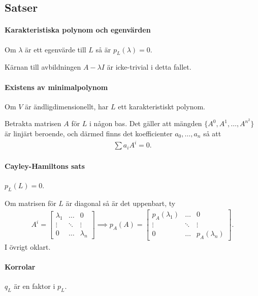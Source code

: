 \subsection{Satser}

\paragraph{Karakteristiska polynom och egenvärden}
Om $\lambda$ är ett egenvärde till $L$ så är $p_{L}(\lambda) = 0$.

\proof
Kärnan till avbildningen $A - \lambda I$ är icke-trivial i detta fallet.

\paragraph{Existens av minimalpolynom}
Om $V$ är ändligdimensionellt, har $L$ ett karakteristiskt polynom.

\proof
Betrakta matrisen $A$ för $L$ i någon bas. Det gäller att mängden $\{A^{0}, A^{1}, \dots, A^{n^2}\}$ är linjärt beroende, och därmed finns det koefficienter $a_{0}, \dots, a_{n}$ så att
\begin{align*}
	\sum a_{i}A^{i} = 0.
\end{align*}

\paragraph{Cayley-Hamiltons sats}
$p_{L}(L) = 0$.

\proof
Om matrisen för $L$ är diagonal så är det uppenbart, ty
\begin{align*}
	A^{i} =
	\left[\begin{array}{ccc}
		\lambda_{1} & \dots  & 0 \\
		\vdots      & \ddots & \vdots \\
		0           & \dots  & \lambda_{n}
	\end{array}\right]
	\implies
	p_{A}(A) =
	\left[\begin{array}{ccc}
		p_{A}(\lambda_{1}) & \dots  & 0 \\
		\vdots             & \ddots & \vdots \\
		0                  & \dots  & p_{A}(\lambda_{n})
	\end{array}\right].
\end{align*}
I övrigt oklart.

\paragraph{Korrolar}
$q_{L}$ är en faktor i $p_{L}$.

